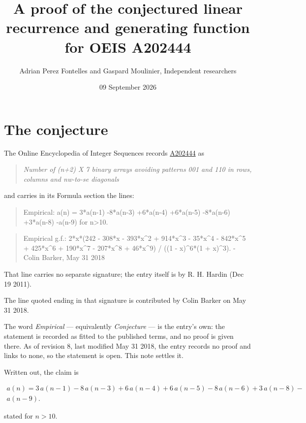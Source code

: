 \documentclass[11pt]{article}
\title{A proof of the conjectured linear recurrence and generating function for OEIS A202444}
\author{Adrian Perez Fontelles and Gaspard Moulinier, Independent researchers}
\date{09 September 2026}
\theoremstyle{definition}
\begin{document}
\maketitle
\section{The conjecture}

The Online Encyclopedia of Integer Sequences records \href{https://oeis.org/A202444}{A202444} as

\begin{quote}\itshape Number of (n+2) X 7 binary arrays avoiding patterns 001 and 110 in rows, columns and nw-to-se diagonals\end{quote}

and carries in its Formula section the lines:

\begin{quote}\ttfamily Empirical: a(n) = 3*a(n-1) -8*a(n-3) +6*a(n-4) +6*a(n-5) -8*a(n-6) +3*a(n-8) -a(n-9) for n>10.\end{quote}

\begin{quote}\ttfamily Empirical g.f.: 2*x*(242 - 308*x - 393*x\textasciicircum{}2 + 914*x\textasciicircum{}3 - 35*x\textasciicircum{}4 - 842*x\textasciicircum{}5 + 425*x\textasciicircum{}6 + 190*x\textasciicircum{}7 - 207*x\textasciicircum{}8 + 46*x\textasciicircum{}9) / ((1 - x)\textasciicircum{}6*(1 + x)\textasciicircum{}3). - Colin Barker, May 31 2018\end{quote}

That line carries no separate signature; the entry itself is by R. H. Hardin (Dec 19 2011).

The line quoted ending in that signature is contributed by Colin Barker on May 31 2018.

The word {\itshape Empirical} --- equivalently {\itshape Conjecture} --- is the entry's own: the statement is recorded as fitted to the published terms, and no proof is given there. As of revision 8, last modified May 31 2018, the entry records no proof and links to none, so the statement is open. This note settles it.

Written out, the claim is

\begin{multline*} a(n) = 3\,a(n-1) - 8\,a(n-3) + 6\,a(n-4) + 6\,a(n-5) - 8\,a(n-6) + 3\,a(n-8) - \\ a(n-9). \end{multline*}

stated for $n > 10$.
\end{document}
